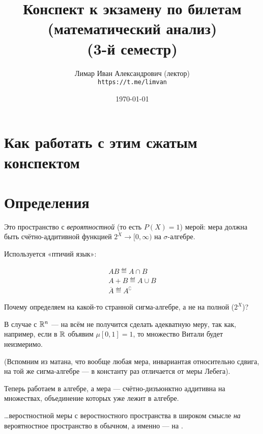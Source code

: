 \documentclass[12pt, a4paper, oneside]{memoir}
\title{Конспект к экзамену по билетам (математический анализ) \\(3-й семестр)}
\author{
  \vova
  \and
  Лимар Иван Александрович (лектор)\\
  \texttt{https://t.me/limvan}
}
\date{\today}
\begin{document}
\maketitle
\newpage
\tableofcontents
\newpage


\section{Как работать с этим сжатым конспектом}



\section{Определения}

\begin{definition}

    Это пространство с \textit{вероятностной} (то есть $P(X) = 1$) мерой: мера должна быть счётно-аддитивной функцией $2^X → [0, ∞)$ на $\sigma$-алгебре.
\end{definition}

Используется «птичий язык»:

\begin{gather*}
    AB \eqdef A \cap B \\
    A + B \eqdef A \cup B \\
    \overline{A} \eqdef A^{\complement}
\end{gather*}

Почему определяем на какой-то странной сигма-алгебре, а не на полной ($2^X$)?

В случае с ${\mathbb{R}}^n$ — на всём не получится сделать адекватную меру, так как, например,
если в ${\mathbb{R}}$ объявим $\mu [0, 1] = 1$, то множество Витали будет неизмеримо.

(Вспомним из матана, что вообще любая мера, инвариантая относительно сдвига,
на той же сигма-алгебре — в константу раз отличается от меры Лебега).

\begin{definition}

    Теперь работаем в алгебре, а мера — счётно-дизъюнктно аддитивна 
    на множествах, объединение которых уже лежит в алгебре.
\end{definition}


\begin{theorem}

    …веростностной меры с веростностного пространства в широком смысле
    \textit{на} вероятностное пространство в обычном, а именно — на .
\end{theorem}
\end{document}
